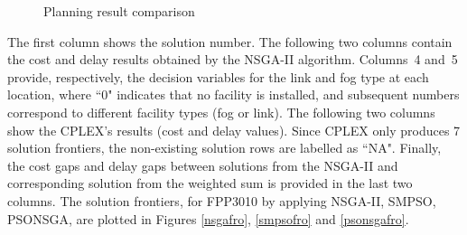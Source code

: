 \documentclass[10pt,journal,compsoc]{IEEEtran}
\begin{document}
   \begin{figure}[!t]   %
\hfil
    \caption{Planning result comparison}
\end{figure}


The first column shows the solution number. The following two columns contain the cost and delay results obtained by the NSGA-II algorithm. Columns~4 and~5 provide, respectively, the decision variables for the link and fog type at each location, where ``0" indicates that no facility is installed, and subsequent numbers correspond to different facility types (fog or link). The following two columns show the CPLEX's results (cost and delay values). Since CPLEX only produces 7 solution frontiers, the non-existing solution rows are labelled as ``NA". Finally, the cost gaps and delay gaps between solutions from the NSGA-II and corresponding solution from the weighted sum is provided in the last two columns. 
The solution frontiers, for FPP3010 by applying NSGA-II, SMPSO, PSONSGA, are plotted in Figures \ref{nsgafro}, \ref{smpsofro} and \ref{psonsgafro}.
\end{document}
